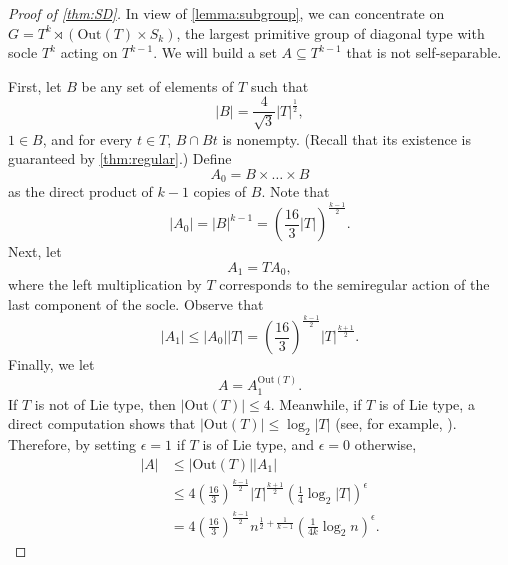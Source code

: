 \documentclass[a4paper]{amsart}
\newcommand{\Out}{\mathrm{Out}}
\theoremstyle{definition}
\begin{document}
\begin{proof}[Proof of \cref{thm:SD}]
    In view of \cref{lemma:subgroup}, we can concentrate on $G = T^k \rtimes (\Out(T) \times S_k)$, the largest primitive group of diagonal type with socle $T^k$ acting on $T^{k-1}$. We will build a set $A \subseteq T^{k-1}$ that is not self-separable.

    First, let $B$ be any set of elements of $T$ such that
    \[ |B| = \frac{4}{\sqrt{3}}  |T|^{\frac{1}{2}} ,\]
    $1 \in B$, and for every $t\in T$, $B\cap Bt$ is nonempty. (Recall that its existence is guaranteed by \cref{thm:regular}.) Define \[A_0 = B \times \ldots \times B\] as the direct product of $k-1$ copies of $B$. Note that
    \[ |A_0| = |B|^{k-1} =  \left(\frac{16}{3} |T| \right)^{\frac{k-1}{2}} .\]
    Next, let \[A_1 = T A_0 ,\]
    where the left multiplication by $T$ corresponds to the semiregular action of the last component of the socle.
    Observe that
    \[ |A_1| \leq |A_0||T| = \left(\frac{16}{3}\right)^{\frac{k-1}{2}} |T|^{\frac{k+1}{2}}  .\]
    Finally, we let
    \[A = A_1^{\Out(T)}.\]
    If $T$ is not of Lie type, then $|\Out(T)|\le 4$. Meanwhile, if $T$ is of Lie type, a direct computation shows that $|\Out(T)| \leq 
    \log_2|T|$ (see, for example, \cite{Kohl2003}). Therefore, by setting $\epsilon = 1$ if $T$ is of Lie type, and $\epsilon = 0$ otherwise,
    \begin{align*}
        |A| &\leq |\Out(T)| |A_1| \\
            &\leq 4 \left(\frac{16}{3}\right)^{\frac{k-1}{2}} |T|^{\frac{k+1}{2}} \left(\frac{1}{4}\log_2|T|\right)^\epsilon\\
            & = 4 \left(\frac{16}{3}\right)^{\frac{k-1}{2}} n^{\frac{1}{2} + \frac{1}{k-1}} \left(\frac{1}{4k}\log_2 n\right)^\epsilon. 
    \end{align*}
    

\end{proof}
\end{document}
